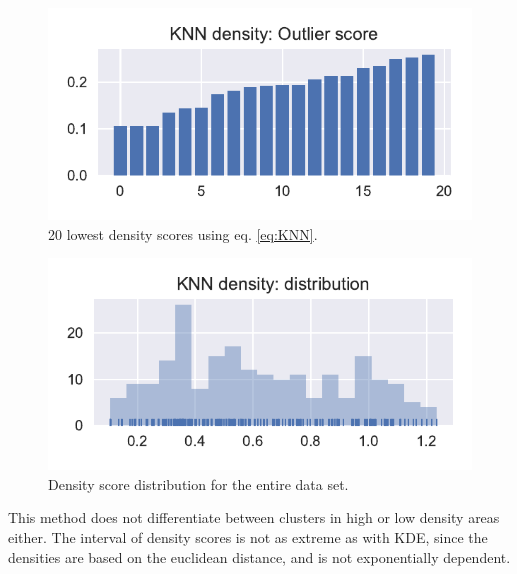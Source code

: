 \begin{multicols}{2}
\begin{figure}[H]
    \includegraphics[width=\linewidth]{fig/KNN_densitybarplot_lowest20.pdf}
    \caption{20 lowest density scores using eq. \eqref{eq:KNN}.}
    \label{fig:KNN_DensityScore}
\end{figure}

\begin{figure}[H]
    \includegraphics[width=\linewidth]{fig/KNN_densitydistribution.pdf}
    \caption{Density score distribution for the entire data set.}
    \label{fig:KNN_DensityDistribution}
\end{figure}
\end{multicols}

This method does not differentiate between clusters in high or low density areas either. The interval of density scores is not as extreme as with KDE, since the densities are based on the euclidean distance, and is not exponentially dependent. 

